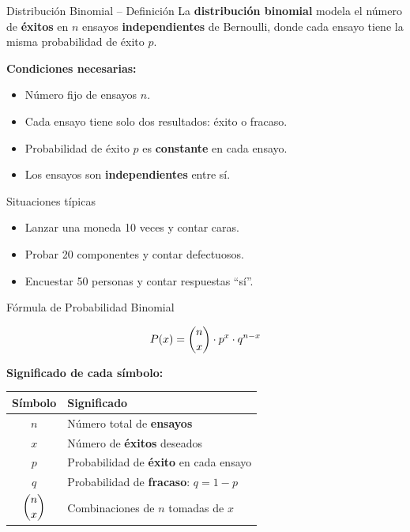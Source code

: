 \documentclass[10pt]{beamer}
\begin{document}
\begin{frame}{Distribución Binomial -- Definición}
\justifying
La \textbf{distribución binomial} modela el número de \textbf{éxitos} en $n$ ensayos \textbf{independientes} de Bernoulli, donde cada ensayo tiene la misma probabilidad de éxito $p$.

\vspace{0.3cm}
\textbf{Condiciones necesarias:}
\begin{itemize}
    \item Número fijo de ensayos $n$.
    \item Cada ensayo tiene solo dos resultados: éxito o fracaso.
    \item Probabilidad de éxito $p$ es \textbf{constante} en cada ensayo.
    \item Los ensayos son \textbf{independientes} entre sí.
\end{itemize}

\vspace{0.2cm}
\begin{exampleblock}{Situaciones típicas}
\begin{itemize}
    \item Lanzar una moneda 10 veces y contar caras.
    \item Probar 20 componentes y contar defectuosos.
    \item Encuestar 50 personas y contar respuestas ``sí''.
\end{itemize}
\end{exampleblock}
\end{frame}

\begin{frame}{Fórmula de Probabilidad Binomial}
\begin{center}
\Large
\[
P(x) = \dbinom{n}{x} \cdot p^{x} \cdot q^{n-x}
\]
\end{center}

\vspace{0.3cm}
\textbf{Significado de cada símbolo:}
\vspace{0.2cm}

\begin{table}
\centering
\begin{tabular}{@{}cl@{}}
\toprule
\textbf{Símbolo} & \textbf{Significado} \\
\midrule
\textcolor{celesteoscuro}{\textbf{$n$}} & Número total de \textbf{ensayos} \\
\textcolor{celesteoscuro}{\textbf{$x$}} & Número de \textbf{éxitos} deseados \\
\textcolor{celesteoscuro}{\textbf{$p$}} & Probabilidad de \textbf{éxito} en cada ensayo \\
\textcolor{celesteoscuro}{\textbf{$q$}} & Probabilidad de \textbf{fracaso}: $q = 1-p$ \\
\textcolor{celesteoscuro}{\textbf{$\dbinom{n}{x}$}} & Combinaciones de $n$ tomadas de $x$ \\
\bottomrule
\end{tabular}
\end{table}
\end{frame}
\end{document}

